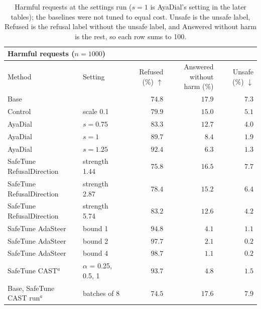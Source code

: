 \documentclass[10pt,a4paper]{article}
\renewcommand{\arraystretch}{1.12}
\begin{document}
\begin{table}[H]\centering\small\renewcommand{\arraystretch}{1.25}\begin{tabular}{|l|l|r|r|r|}\hline
\multicolumn{5}{|l|}{\textbf{Harmful requests ($n = 1000$)}}\\\hline
Method & Setting & Refused (\%) $\uparrow$ & \makecell[r]{Answered without\\harm (\%)} & Unsafe (\%) $\downarrow$\\\hline
Base &  & $74.8$ & $17.9$ & $7.3$\\\hline
Control & scale 0.1 & $79.9$ & $15.0$ & $5.1$\\\hline
AyaDial & $s = 0.75$ & $83.3$ & $12.7$ & $4.0$\\\hline
AyaDial & $s = 1$ & $89.7$ & $8.4$ & $1.9$\\\hline
AyaDial & $s = 1.25$ & $92.4$ & $6.3$ & $1.3$\\\hline
SafeTune RefusalDirection & strength 1.44 & $75.8$ & $16.5$ & $7.7$\\\hline
SafeTune RefusalDirection & strength 2.87 & $78.4$ & $15.2$ & $6.4$\\\hline
SafeTune RefusalDirection & strength 5.74 & $83.2$ & $12.6$ & $4.2$\\\hline
SafeTune AdaSteer & bound 1 & $94.8$ & $4.1$ & $1.1$\\\hline
SafeTune AdaSteer & bound 2 & $97.7$ & $2.1$ & $\mathbf{0.2}$\\\hline
SafeTune AdaSteer & bound 4 & $\mathbf{98.7}$ & $1.1$ & $\mathbf{0.2}$\\\hline
SafeTune CAST$^{a}$ & $\alpha$ = 0.25, 0.5, 1 & $93.7$ & $4.8$ & $1.5$\\\hline
Base, SafeTune CAST run$^{a}$ & batches of 8 & $74.5$ & $17.6$ & $7.9$\\\hline
\end{tabular}
\caption{Harmful requests at the settings run ($s = 1$ is AyaDial's setting in the later tables); the baselines were not tuned to equal cost. Unsafe is the unsafe label, Refused is the refusal label without the unsafe label, and Answered without harm is the rest, so each row sums to 100.}\label{tab:mainh}\end{table}
\end{document}
